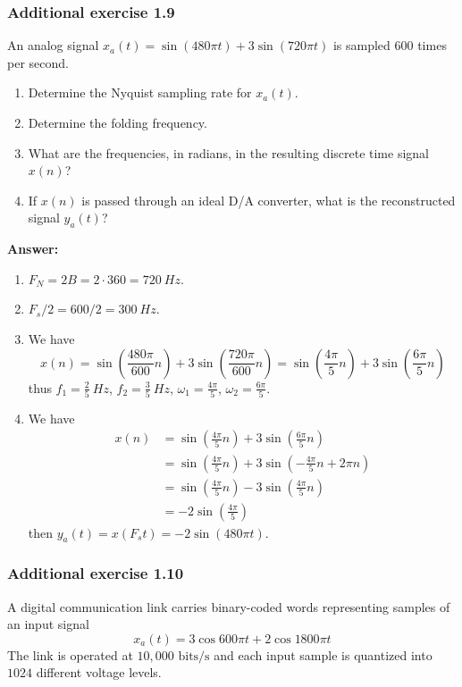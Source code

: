 \documentclass[12pt,a4paper]{article}
\begin{document}
\subsubsection*{Additional exercise 1.9}
\noindent
An analog signal $x_a(t) = \sin(480\pi t) + 3 \sin(720\pi t)$ is sampled 600 times per second.

\begin{enumerate}[label=\textbf{(\alph*)}, leftmargin=*]
    \item Determine the Nyquist sampling rate for $x_a(t)$.
    \item Determine the folding frequency.
    \item What are the frequencies, in radians, in the resulting discrete time signal $x(n)$?
    \item If $x(n)$ is passed through an ideal D/A converter, what is the reconstructed signal $y_a(t)$?
\end{enumerate}

\noindent\textbf{Answer:}
\begin{enumerate}[label=\textbf{(\alph*)}, leftmargin=*]
    \item $F_N = 2B = 2\cdot 360 = 720\: Hz$.
    \item $F_s/2 = 600/2 = 300\: Hz$.
    \item We have
    \[x(n) = \sin(\frac{480\pi}{600}n)+3\sin(\frac{720\pi}{600}n) = \sin(\frac{4\pi}{5}n)+3\sin(\frac{6\pi}{5}n)\]
    thus $f_1 = \frac{2}{5}\: Hz$, $f_2 = \frac{3}{5}\: Hz$, $\omega_1 = \frac{4\pi}{5}$, $\omega_2 = \frac{6\pi}{5}$. 
    \item We have
    \begin{align*}
        x(n)&=\sin(\frac{4\pi}{5}n)+3\sin(\frac{6\pi}{5}n)\\
    &=\sin(\frac{4\pi}{5}n)+3\sin(-\frac{4\pi}{5}n + 2\pi n)\\
    &=\sin(\frac{4\pi}{5}n)-3\sin(\frac{4\pi}{5}n)\\
    &=-2\sin(\frac{4\pi}{5})
\end{align*}
then $y_a(t) = x(F_st) = -2\sin(480\pi t)$.
\end{enumerate}

\subsubsection*{Additional exercise 1.10}
\noindent
A digital communication link carries binary-coded words representing samples of an input signal
\[
x_a(t) = 3 \cos 600\pi t + 2 \cos 1800\pi t
\]
The link is operated at $10,000\text{ bits/s}$ and each input sample is quantized into $1024$ different voltage levels.
\end{document}

